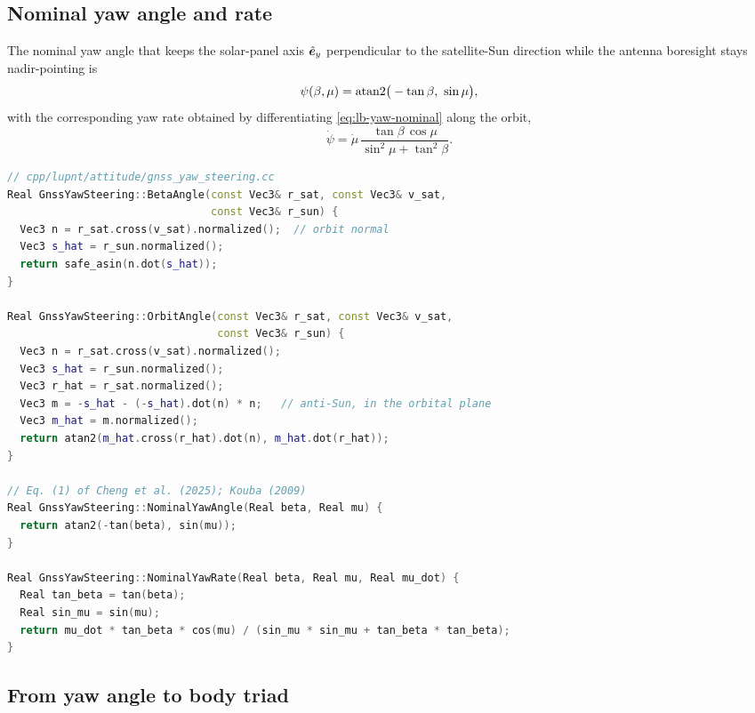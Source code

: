 \subsection{Nominal yaw angle and rate}
\label{sec:lb-yaw-nominal}

The nominal yaw angle that keeps the solar-panel axis $\hat{\bm{e}}_y$
perpendicular to the satellite-Sun direction while the antenna boresight stays
nadir-pointing is
\begin{equation}
  \psi(\beta, \mu)
  = \operatorname{atan2}\!\big(-\tan\beta,\ \sin\mu\big),
  \label{eq:lb-yaw-nominal}
\end{equation}
with the corresponding yaw rate obtained by differentiating
\cref{eq:lb-yaw-nominal} along the orbit,
\begin{equation}
  \dot{\psi}
  = \dot{\mu}\,
    \frac{\tan\beta\,\cos\mu}
         {\sin^{2}\!\mu + \tan^{2}\!\beta}.
  \label{eq:lb-yaw-rate}
\end{equation}

\begin{lstlisting}[language=cpp, caption={Satellite-Sun-Earth geometry and the
nominal yaw law.}, label={lst:lb-yaw}]
// cpp/lupnt/attitude/gnss_yaw_steering.cc
Real GnssYawSteering::BetaAngle(const Vec3& r_sat, const Vec3& v_sat,
                                const Vec3& r_sun) {
  Vec3 n = r_sat.cross(v_sat).normalized();  // orbit normal
  Vec3 s_hat = r_sun.normalized();
  return safe_asin(n.dot(s_hat));
}

Real GnssYawSteering::OrbitAngle(const Vec3& r_sat, const Vec3& v_sat,
                                 const Vec3& r_sun) {
  Vec3 n = r_sat.cross(v_sat).normalized();
  Vec3 s_hat = r_sun.normalized();
  Vec3 r_hat = r_sat.normalized();
  Vec3 m = -s_hat - (-s_hat).dot(n) * n;   // anti-Sun, in the orbital plane
  Vec3 m_hat = m.normalized();
  return atan2(m_hat.cross(r_hat).dot(n), m_hat.dot(r_hat));
}

// Eq. (1) of Cheng et al. (2025); Kouba (2009)
Real GnssYawSteering::NominalYawAngle(Real beta, Real mu) {
  return atan2(-tan(beta), sin(mu));
}

Real GnssYawSteering::NominalYawRate(Real beta, Real mu, Real mu_dot) {
  Real tan_beta = tan(beta);
  Real sin_mu = sin(mu);
  return mu_dot * tan_beta * cos(mu) / (sin_mu * sin_mu + tan_beta * tan_beta);
}
\end{lstlisting}

\subsection{From yaw angle to body triad}
\label{sec:lb-yaw-frame}

